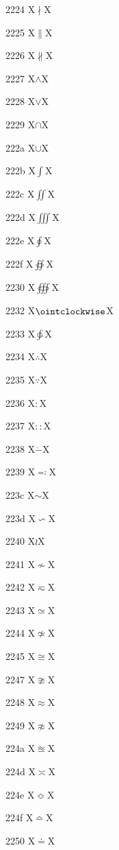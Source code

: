 \documentclass[11pt]{article}
\begin{document}
2224 X{\ensuremath{\nmid}}X

2225 X{\ensuremath{\parallel}}X

2226 X{\ensuremath{\nparallel}}X

2227 X{\ensuremath{\wedge}}X

2228 X{\ensuremath{\vee}}X

2229 X{\ensuremath{\cap}}X

222a X{\ensuremath{\cup}}X

222b X{\ensuremath{\int}}X

222c X{\ensuremath{\iint}}X

222d X{\ensuremath{\iiint}}X

222e X{\ensuremath{\oint}}X

222f X{\ensuremath{\oiint}}X

2230 X{\ensuremath{\oiiint}}X

2232 X{\ensuremath{\ointclockwise}}X

2233 X{\ensuremath{\ointctrclockwise}}X

2234 X{\ensuremath{\therefore}}X

2235 X{\ensuremath{\because}}X

2236 X{\ensuremath{\mathrel{:}}}X

2237 X{\ensuremath{\mathrel{::}}}X

2238 X{\ensuremath{\dot{-}}}X

2239 X{\ensuremath{\eqcolon}}X

223c X{\ensuremath{\sim}}X

223d X{\ensuremath{\backsim}}X

2240 X{\ensuremath{\wr}}X

2241 X{\ensuremath{\nsim}}X

2242 X{\ensuremath{\eqsim}}X

2243 X{\ensuremath{\simeq}}X

2244 X{\ensuremath{\nsimeq}}X

2245 X{\ensuremath{\cong}}X

2247 X{\ensuremath{\ncong}}X

2248 X{\ensuremath{\approx}}X

2249 X{\ensuremath{\napprox}}X

224a X{\ensuremath{\approxeq}}X

224d X{\ensuremath{\asymp}}X

224e X{\ensuremath{\Bumpeq}}X

224f X{\ensuremath{\bumpeq}}X

2250 X{\ensuremath{\doteq}}X
\end{document}
